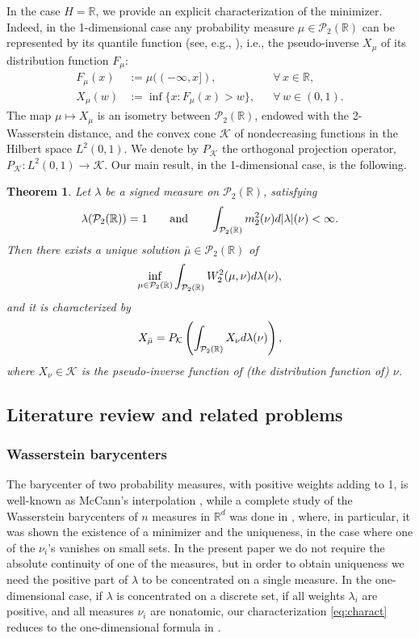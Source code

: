 \documentclass[12pt,a4paper]{article}
\newcommand{\R}{\mathbb{R}}
\renewcommand{\P}{\mathcal{P}}
\renewcommand{\d}{{\rm d}}
\newcommand{\K}{\mathcal{K}}
\theoremstyle{plain}
\newtheorem{theorem}{Theorem}[section]
\theoremstyle{definition}
\begin{document}
In the case $H = \R$, we provide an explicit characterization of the minimizer. Indeed, in the 1-dimensional case any probability measure $\mu\in \P_2(\R)$ can be represented by its quantile function (see, e.g., \cite[Theorem 2.18]{villani_TOT}), i.e., the pseudo-inverse $X_\mu$ of its distribution function $F_\mu$:
\begin{align*}
	F_\mu(x)&:= \mu((-\infty,x]), & &\forall\,x\in \R,\\
	X_\mu(w)&:=\inf \{ x: F_\mu(x)>w\}, & &\forall\,w\in (0,1).
\end{align*}
The map $\mu \mapsto X_\mu$ is an isometry between $\P_2(\R)$, endowed with the 2-Wasserstein distance, and the convex cone $\K$ of nondecreasing functions in the Hilbert space $L^2(0,1)$. We denote by $P_\K$ the orthogonal projection operator, $P_\K:L^2(0,1)\to \K$.
Our main result, in the 1-dimensional case, is the following.
\begin{theorem}
\label{th:intro}
Let $\lambda$ be a signed measure on $\P_2(\R)$, satisfying
\begin{equation}
\label{eq:main_hyp_1d}
	\lambda(\P_2(\R))=1\qquad \text{and}\qquad  \int_{\P_2(\R)}  m_2^2(\nu)\d|\lambda|(\nu)<\infty.
\end{equation}
Then there exists a unique solution $\bar \mu \in \P_2(\R)$ of
\[	
	\inf_{\mu \in \P_2(\R)} \int_{\P_2(\R)} W^2_2(\mu,\nu)\d\lambda(\nu),
\]
and it is characterized by
\begin{equation}
\label{eq:charact}
	X_{\bar \mu} = P_\K\left( \int_{\P_2(\R)} X_{\nu} \d\lambda(\nu)\right),
\end{equation}
where $X_{\nu}\in \K$ is the pseudo-inverse function of (the distribution function of) $\nu$.
\end{theorem}

\subsection{Literature review and related problems}
\subsubsection*{Wasserstein barycenters} The barycenter of two probability measures, with positive weights adding to 1, is well-known as McCann's interpolation \cite{mc_cann}, while a complete study of the Wasserstein barycenters of $n$ measures in $\R^d$ was done in \cite{agueh-carlier}, where, in particular, it was shown the existence of a minimizer and the uniqueness, in the case where one of the $\nu_i$'s vanishes on small sets. In the present paper we do not require the absolute continuity of one of the measures, but in order to obtain uniqueness we need the positive part of $\lambda$ to be concentrated on a single measure. In the one-dimensional case, if $\lambda$ is concentrated on a discrete set,  if all weights $\lambda_i$ are positive, and all measures $\nu_i$ are nonatomic, our characterization \eqref{eq:charact} reduces to the one-dimensional formula in \cite[Section 6.1]{agueh-carlier}.
\end{document}
